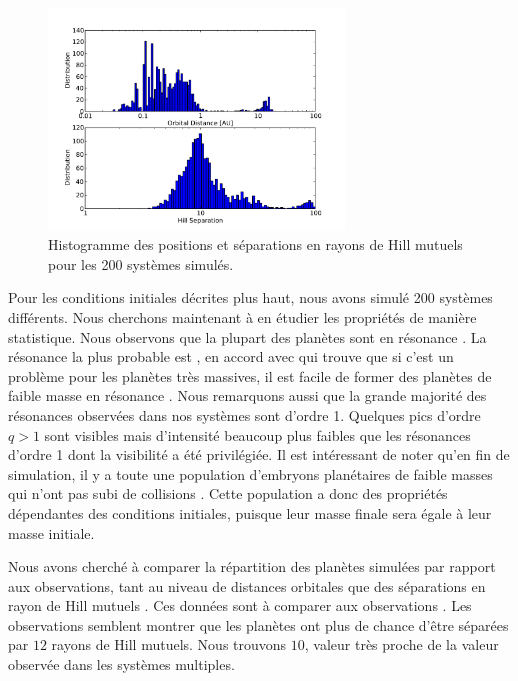 \begin{figure}[htbp]
\centering
\includegraphics[width=0.7\textwidth]{figure/HSE/hist_ad.pdf}
\caption{Histogramme des positions et séparations en rayons de Hill mutuels pour les 200 systèmes
simulés.}\label{fig:HSE_stat_dist}
\end{figure}

Pour les conditions initiales décrites plus haut, nous avons simulé 200 systèmes différents. Nous cherchons maintenant à en
étudier les propriétés de manière statistique. Nous observons que la plupart des planètes sont en résonance
. La résonance la plus probable est , en accord avec \cite{rein2012traditional} qui trouve que si
c'est un problème pour les planètes très massives, il est facile de former des planètes de faible masse en résonance .
Nous remarquons aussi que la grande majorité des résonances observées dans nos systèmes sont d'ordre 1. Quelques pics d'ordre
$q>1$ sont visibles mais d'intensité beaucoup plus faibles que les résonances d'ordre 1 dont la visibilité a été privilégiée. Il
est intéressant de noter qu'en fin de simulation, il y a toute une population d'embryons planétaires de faible masses qui n'ont
pas subi de collisions . Cette population a donc des propriétés dépendantes des conditions initiales,
puisque leur masse finale sera égale à leur masse initiale. 

Nous avons cherché à comparer la répartition des planètes simulées par rapport aux observations, tant au niveau de distances orbitales que des séparations en rayon de Hill mutuels . Ces données sont à comparer aux observations . Les observations semblent montrer que les planètes ont plus de chance d'être séparées par $12$ rayons de Hill mutuels. Nous trouvons $10$, valeur très proche de la valeur observée dans les systèmes multiples. 

